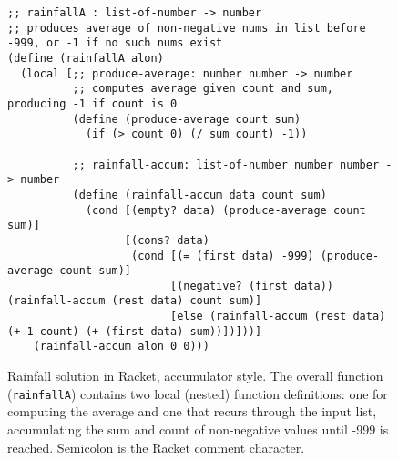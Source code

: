 \begin{figure*}
\begin{lstlisting}
;; rainfallA : list-of-number -> number
;; produces average of non-negative nums in list before -999, or -1 if no such nums exist
(define (rainfallA alon)
  (local [;; produce-average: number number -> number
          ;; computes average given count and sum, producing -1 if count is 0
          (define (produce-average count sum)
            (if (> count 0) (/ sum count) -1))

          ;; rainfall-accum: list-of-number number number -> number
          (define (rainfall-accum data count sum)
            (cond [(empty? data) (produce-average count sum)]
                  [(cons? data)
                   (cond [(= (first data) -999) (produce-average count sum)]
                         [(negative? (first data)) (rainfall-accum (rest data) count sum)]
                         [else (rainfall-accum (rest data) (+ 1 count) (+ (first data) sum))])]))]
    (rainfall-accum alon 0 0)))
\end{lstlisting}
\caption{Rainfall solution in Racket, accumulator style.  The overall
  function (\lstinline{rainfallA}) contains two local (nested) function
  definitions: one for computing the average and one that recurs
  through the input list, accumulating the sum and count of
  non-negative values until -999 is reached. Semicolon is the Racket
  comment character.}
\label{f:rainfall-accum}
\end{figure*}




